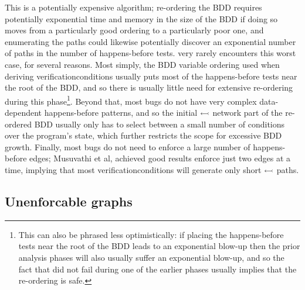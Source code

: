 This is a potentially expensive algorithm; re-ordering the BDD
requires potentially exponential time and memory in the size of the
BDD if doing so moves from a particularly good ordering to a
particularly poor one, and enumerating the paths could likewise
potentially discover an exponential number of paths in the number of
happens-before tests.  {\Technique} very rarely encounters this worst
case, for several reasons.  Most simply, the BDD variable ordering
used when deriving \glspl{verificationcondition} usually puts most of
the happens-before tests near the root of the BDD, and so there is
usually little need for extensive re-ordering during this
phase\footnote{This can also be phrased less optimistically: if
  placing the happens-before tests near the root of the BDD leads to
  an exponential blow-up then the prior analysis phases will also
  usually suffer an exponential blow-up, and so the fact that
  {\technique} did not fail during one of the earlier phases usually
  implies that the re-ordering is safe.}.  Beyond that, most bugs do
not have very complex data-dependent happens-before patterns, and so
the initial $\leftarrowtail$ network part of the re-ordered BDD
usually only has to select between a small number of conditions over
the program's state, which further restricts the scope for excessive
BDD growth.  Finally, most bugs do not need to enforce a large number
of happens-before edges; Musuvathi et al\cite{Musuvathi2007}, achieved
good results enforce just two edges at a time, implying that most
\glspl{verificationcondition} will generate only short
$\leftarrowtail$ paths.

\subsection{Unenforcable graphs}
\label{sect:reproduce:unenforcable}

